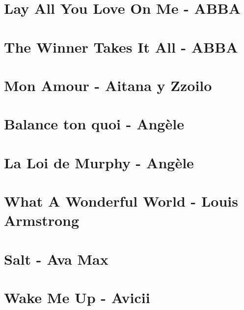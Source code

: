 \documentclass[11pt]{article}
\begin{document}
\linespread{0.3}
\tableofcontents
\newpage



\section{Lay All You Love On Me - ABBA}


\section{The Winner Takes It All - ABBA}



\section{Mon Amour - Aitana y Zzoilo}



\section{Balance ton quoi - Angèle}
\begin{guitar}

\end{guitar}

\section{La Loi de Murphy - Angèle}
\begin{guitar}

\end{guitar}


\section*{What A Wonderful World - Louis Armstrong}
\begin{guitar}

\end{guitar}

\section{Salt - Ava Max}



\section{Wake Me Up - Avicii}

\end{document}
